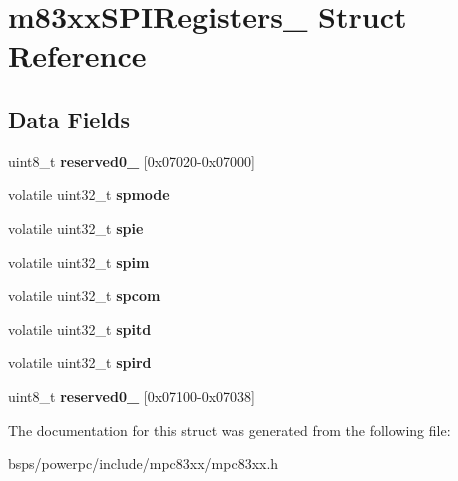 \hypertarget{structm83xxSPIRegisters__}{}\section{m83xx\+S\+P\+I\+Registers\+\_\+ Struct Reference}
\label{structm83xxSPIRegisters__}
\subsection*{Data Fields}
\begin{DoxyCompactItemize}
\item 
\mbox{\label{structm83xxSPIRegisters___a0037018228391987eafbd6adaefa4f82}} 
uint8\+\_\+t {\bfseries reserved0\+\_} \mbox{[}0x07020-\/0x07000\mbox{]}
\item 
\mbox{\label{structm83xxSPIRegisters___ade0a416392ffa790cc5706ad640d35f4}} 
volatile uint32\+\_\+t {\bfseries spmode}
\item 
\mbox{\label{structm83xxSPIRegisters___aeea60f35469cd85093d81aa067acc0e4}} 
volatile uint32\+\_\+t {\bfseries spie}
\item 
\mbox{\label{structm83xxSPIRegisters___a400a99a53d1a9c31cd2f1b3aa2f93535}} 
volatile uint32\+\_\+t {\bfseries spim}
\item 
\mbox{\label{structm83xxSPIRegisters___a0b76c4745e3ecf18e87db8044b58f096}} 
volatile uint32\+\_\+t {\bfseries spcom}
\item 
\mbox{\label{structm83xxSPIRegisters___a0593ae8578fe30319ed02357fe280e98}} 
volatile uint32\+\_\+t {\bfseries spitd}
\item 
\mbox{\label{structm83xxSPIRegisters___aad60964253dfbb12fa0980899efafcd5}} 
volatile uint32\+\_\+t {\bfseries spird}
\item 
\mbox{\label{structm83xxSPIRegisters___a6ebfc5bfeeabdee6c89f0a00ba77715e}} 
uint8\+\_\+t {\bfseries reserved0\+\_} \mbox{[}0x07100-\/0x07038\mbox{]}
\end{DoxyCompactItemize}


The documentation for this struct was generated from the following file\+:\begin{DoxyCompactItemize}
\item 
bsps/powerpc/include/mpc83xx/mpc83xx.\+h\end{DoxyCompactItemize}
